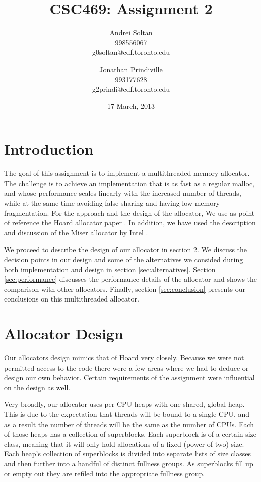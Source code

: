 \documentclass{article}
\author{Andrei Soltan\\998556067\\g0soltan@cdf.toronto.edu
\and Jonathan Prindiville\\993177628\\g2prindi@cdf.toronto.edu}
\title{CSC469: Assignment 2}
\date{17 March, 2013}
\begin{document}
\maketitle

\tableofcontents

\newpage
\section{Introduction}

The goal of this assignment is to implement a multithreaded memory allocator.
The challenge is to achieve an implementation that is as fast as a regular 
malloc, and whose performance scales linearly with the increased number of
threads, while at the same time avoiding false sharing and having low 
memory fragmentation. For the approach and the design of the allocator, 
We use as point of reference the Hoard allocator paper \cite{berger00}.
In addition, we have used the description and discussion of the Miser allocator
by Intel \cite{miser-intel}.

We proceed to describe the design of our allocator in section \ref{sec:design}. 
We discuss the decision points in our design and some of the alternatives we 
consided during both implementation and design in section \ref{sec:alternatives}.
Section \ref{sec:performance} discusses the performance details of the allocator
and shows the comparison with other allocators. Finally, section 
\ref{sec:conclusion} presents our conclusions on this multithreaded allocator.

\newpage
\section{Allocator Design}
\label{sec:design}

Our allocators design mimics that of Hoard \cite{berger00} very closely.
Because we were not permitted access to the code there were a few areas where 
we had to deduce or design our own behavior. Certain requirements of the 
assignment were influential on the design as well.

Very broadly, our allocator uses per-CPU heaps with one shared, global heap.
This is due to the expectation that threads will be bound to a single CPU,
and as a result the number of threads will be the same as the number of CPUs.
Each of those heaps has a collection of superblocks. Each superblock is of a
certain size class, meaning that it will only hold allocations of a fixed
(power of two) size. Each heap's collection of superblocks is divided into
separate lists of size classes and then further into a handful of distinct
fullness groups. As superblocks fill up or empty out they are refiled into
the appropriate fullness group.
\end{document}

